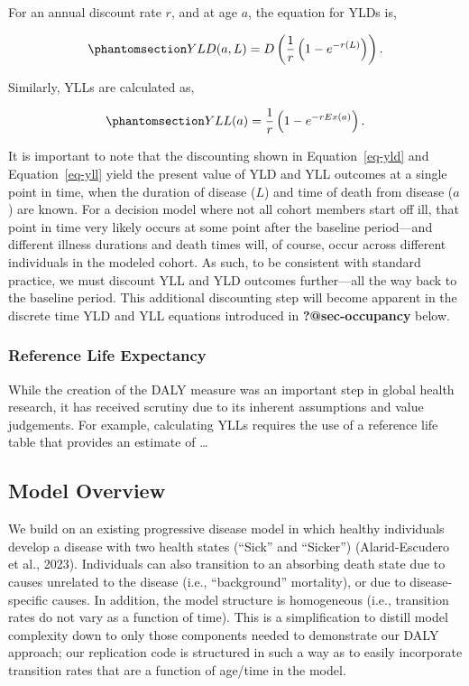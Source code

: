 \documentclass[
]{agujournal2019}
\begin{document}
For an annual discount rate \(r\), and at age \(a\), the equation for
YLDs is,

\begin{equation}\phantomsection\label{eq-yld}{
YLD(a,L) = D  \left ( \frac{1}{r}\left(1-e^{-r(L) }\right) \right ).
}\end{equation}

Similarly, YLLs are calculated as,

\begin{equation}\phantomsection\label{eq-yll}{
YLL(a)= \frac{1}{r}\left(1-e^{-r Ex(a)}\right).
}\end{equation}

It is important to note that the discounting shown in
Equation~\ref{eq-yld} and Equation~\ref{eq-yll} yield the present value
of YLD and YLL outcomes at a single point in time, when the duration of
disease (\(L\)) and time of death from disease (\(a\)) are known. For a
decision model where not all cohort members start off ill, that point in
time very likely occurs at some point after the baseline period---and
different illness durations and death times will, of course, occur
across different individuals in the modeled cohort. As such, to be
consistent with standard practice, we must discount YLL and YLD outcomes
further---all the way back to the baseline period. This additional
discounting step will become apparent in the discrete time YLD and YLL
equations introduced in \textbf{?@sec-occupancy} below.

\subsubsection{Reference Life
Expectancy}\label{reference-life-expectancy}

While the creation of the DALY measure was an important step in global
health research, it has received scrutiny due to its inherent
assumptions and value judgements. For example, calculating YLLs requires
the use of a reference life table that provides an estimate of \ldots{}

\subsection{Model Overview}\label{model-overview}

We build on an existing progressive disease model in which healthy
individuals develop a disease with two health states (``Sick'' and
``Sicker'') (Alarid-Escudero et al., 2023). Individuals can also
transition to an absorbing death state due to causes unrelated to the
disease (i.e., ``background'' mortality), or due to disease-specific
causes. In addition, the model structure is homogeneous (i.e.,
transition rates do not vary as a function of time). This is a
simplification to distill model complexity down to only those components
needed to demonstrate our DALY approach; our replication code is
structured in such a way as to easily incorporate transition rates that
are a function of age/time in the model.
\end{document}
